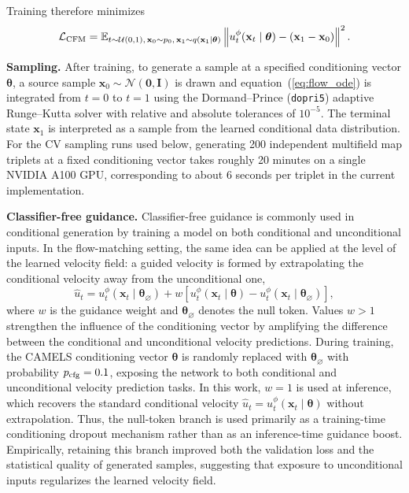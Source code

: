 \documentclass{article}
\newcommand{\thetavec}{\boldsymbol{\theta}}
\begin{document}
Training therefore minimizes
\begin{equation}
  \mathcal{L}_{\rm CFM} =
  \mathbb{E}_{t\sim\mathcal{U}(0,1),\,
  \mathbf{x}_0\sim p_0,\,
  \mathbf{x}_1\sim q(\mathbf{x}_1\mid\thetavec)}
  \left\|
    u_t^\phi(\mathbf{x}_t\mid\thetavec)
    - (\mathbf{x}_1-\mathbf{x}_0)
  \right\|^2 .
  \label{eq:cfm}
\end{equation}

\textbf{Sampling.}
After training, to generate a sample at a specified
conditioning vector $\thetavec$, a source sample
$\mathbf{x}_0 \sim \mathcal{N}(\mathbf{0},\mathbf{I})$ is drawn and
equation~(\ref{eq:flow_ode}) is integrated from $t=0$ to $t=1$ using the
Dormand--Prince (\texttt{dopri5}) adaptive Runge--Kutta solver with
relative and absolute tolerances of $10^{-5}$. The terminal state
$\mathbf{x}_{1}$ is interpreted as a sample from the learned
conditional data distribution. For the CV sampling runs used below,
generating 200 independent multifield map triplets at a fixed
conditioning vector takes roughly 20 minutes on a single NVIDIA A100
GPU, corresponding to about 6 seconds per triplet in the current
implementation.

\textbf{Classifier-free guidance.}
Classifier-free guidance \citep[CFG;][]{Ho2022} is commonly used in
conditional generation by training a model on both conditional and
unconditional inputs. In the flow-matching setting, the same idea can
be applied at the level of the learned velocity field: a guided
velocity is formed by extrapolating the conditional velocity away from
the unconditional one,
\begin{equation}
  \hat{u}_t
  =
  u_t^\phi(\mathbf{x}_t \mid \thetavec_\varnothing)
  + w\left[
    u_t^\phi(\mathbf{x}_t \mid \thetavec)
    - u_t^\phi(\mathbf{x}_t \mid \thetavec_\varnothing)
  \right],
  \label{eq:cfg}
\end{equation}
where $w$ is the guidance weight and $\thetavec_\varnothing$ denotes
the null token. Values $w>1$ strengthen the influence of the
conditioning vector by amplifying the difference between the
conditional and unconditional velocity predictions.
During training, the CAMELS conditioning vector $\thetavec$ is randomly
replaced with $\thetavec_\varnothing$ with probability
$p_{\rm cfg}=0.1$, exposing the network to both conditional and
unconditional velocity prediction tasks. In this work, $w=1$ is used at
inference, which recovers the standard conditional velocity
$\hat{u}_t = u_t^\phi(\mathbf{x}_t \mid \thetavec)$ without
extrapolation. Thus, the null-token branch is used primarily as a
training-time conditioning dropout mechanism rather than as an
inference-time guidance boost. Empirically, retaining this branch
improved both the validation loss and the statistical quality of
generated samples, suggesting that exposure to unconditional inputs
regularizes the learned velocity field.
\end{document}
